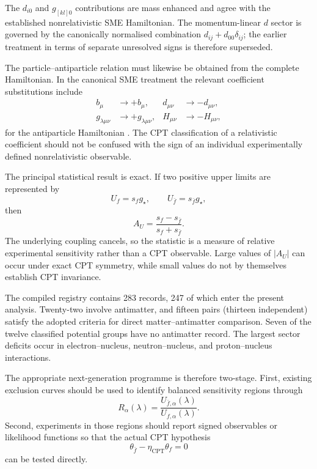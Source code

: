 \documentclass[aps,prd,reprint,superscriptaddress,nofootinbib]{revtex4-2}
\newcommand{\CPT}{\mathrm{CPT}}
\begin{document}
	The $d_{i0}$ and $g_{[kl]0}$ contributions are mass enhanced and agree
	with the established nonrelativistic SME Hamiltonian. The momentum-linear
	$d$ sector is governed by the canonically normalised combination
	$d_{ij}+d_{00}\delta_{ij}$; the earlier treatment in terms of separate
	unresolved signs is therefore superseded.
	
	The particle--antiparticle relation must likewise be obtained from the
	complete Hamiltonian. In the canonical SME treatment the relevant
	coefficient substitutions include
	\begin{equation}
		\begin{aligned}
			b_\mu&\rightarrow+b_\mu, & d_{\mu\nu}&\rightarrow-d_{\mu\nu},\\
			g_{\lambda\mu\nu}&\rightarrow+g_{\lambda\mu\nu}, & H_{\mu\nu}&\rightarrow-H_{\mu\nu},
		\end{aligned}
	\end{equation}
	for the antiparticle Hamiltonian \cite{KosteleckyLane1999}. The CPT
	classification of a relativistic coefficient should not be confused
	with the sign of an individual experimentally defined nonrelativistic
	observable.
	
	The principal statistical result is exact. If two positive upper
	limits are represented by
	\begin{equation}
		U_f=s_f g_\star,
		\qquad
		U_{\bar f}=s_{\bar f}g_\star,
	\end{equation}
	then
	\begin{equation}
		A_U
		=
		\frac{s_f-s_{\bar f}}
		{s_f+s_{\bar f}}.
	\end{equation}
	The underlying coupling cancels, so the statistic is a measure of
	relative experimental sensitivity rather than a CPT observable.
	Large values of $|A_U|$ can occur under exact CPT symmetry, while
	small values do not by themselves establish CPT invariance.
	
	The compiled registry contains 283 records, 247 of which enter the present analysis. Twenty-two involve antimatter, and fifteen pairs (thirteen independent) satisfy the adopted criteria for direct matter--antimatter comparison. Seven of the twelve classified potential groups have no antimatter record. The
	largest sector deficits occur in electron--nucleus, neutron--nucleus,
	and proton--nucleus interactions.
	
	The appropriate next-generation programme is therefore two-stage.
	First, existing exclusion curves should be used to identify balanced
	sensitivity regions through
	\begin{equation}
		R_\alpha(\lambda)
		=
		\frac{U_{\bar f,\alpha}(\lambda)}
		{U_{f,\alpha}(\lambda)}.
	\end{equation}
	Second, experiments in those regions should report signed observables
	or likelihood functions so that the actual CPT hypothesis
	\begin{equation}
		\theta_{\bar f}-\eta_\CPT\theta_f=0
	\end{equation}
	can be tested directly.
	
\end{document}
